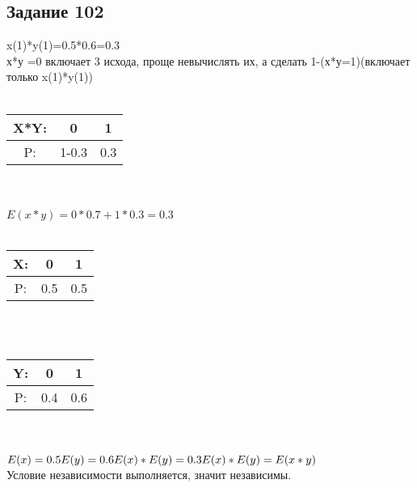 \documentclass[12pt]{article}
\begin{document}
\subsection{Задание 102}
x(1)*y(1)=0.5*0.6=0.3\\
х*у =0 включает 3 исхода, проще невычислять их, а сделать 1-(х*у=1)(включает только x(1)*y(1))\\
\\
\begin{tabular}{|c|c|c|}
\hline
X*Y: & 0 & 1  \\
\hline
P: & 1-0.3 & 0.3  \\
\hline
\end{tabular}
\\
\\
$E(x*y)=0*0.7+1*0.3=0.3$\\
\\
\begin{tabular}{|c|c|c|}
\hline
X: & 0 & 1  \\
\hline
P: & 0.5 & 0.5  \\
\hline
\end{tabular}
\\
\\
\begin{tabular}{|c|c|c|}
\hline
Y: & 0 & 1  \\
\hline
P: & 0.4 & 0.6  \\
\hline
\end{tabular}
\\
\\
$
E(x)=0.5\\
E(y)=0.6\\
E(x)*E(y)=0.3\\
E(x)*E(y) = E(x*y)\\
$ \\
Условие независимости выполняется, значит независимы.\\
\newpage
\end{document}
